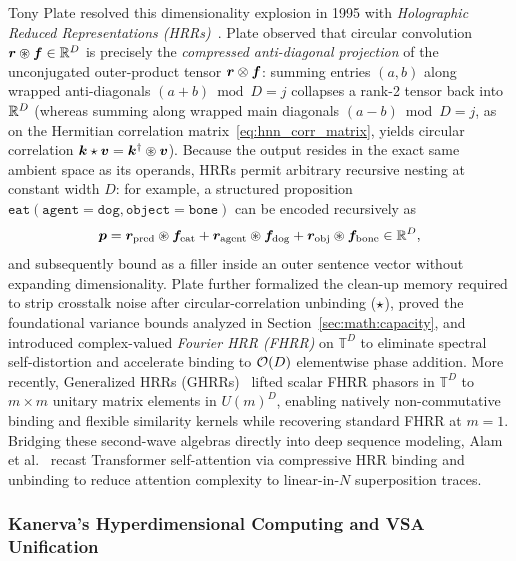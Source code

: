 Tony Plate resolved this dimensionality explosion in 1995 with \emph{Holographic Reduced Representations (HRRs)}~\cite{PLATE_1995_HRR}.
Plate observed that circular convolution $\boldsymbol{r} \circledast \boldsymbol{f} \in \mathbb{R}^D$ is precisely the \emph{compressed anti-diagonal projection} of the unconjugated outer-product tensor $\boldsymbol{r} \otimes \boldsymbol{f}$: summing entries $(a,b)$ along wrapped anti-diagonals $(a + b) \bmod D = j$ collapses a rank-2 tensor back into $\mathbb{R}^D$ (whereas summing along wrapped main diagonals $(a - b) \bmod D = j$, as on the Hermitian correlation matrix~\eqref{eq:hnn_corr_matrix}, yields circular correlation $\boldsymbol{k} \star \boldsymbol{v} = {\boldsymbol{k}}^{\dagger} \circledast \boldsymbol{v}$).
Because the output resides in the exact same ambient space as its operands, HRRs permit arbitrary recursive nesting at constant width $D$: for example, a structured proposition $\texttt{eat}(\texttt{agent}{=}\texttt{dog}, \texttt{object}{=}\texttt{bone})$ can be encoded recursively as
\begin{equation}\label{eq:hrr_recursive}
    \boldsymbol{p} = \boldsymbol{r}_{\mathrm{pred}} \circledast \boldsymbol{f}_{\mathrm{eat}}
             + \boldsymbol{r}_{\mathrm{agent}} \circledast \boldsymbol{f}_{\mathrm{dog}}
             + \boldsymbol{r}_{\mathrm{obj}} \circledast \boldsymbol{f}_{\mathrm{bone}} \in \mathbb{R}^D,
\end{equation}
and subsequently bound as a filler inside an outer sentence vector without expanding dimensionality.
Plate further formalized the clean-up memory required to strip crosstalk noise after circular-correlation unbinding ($\star$), proved the foundational variance bounds analyzed in Section~\ref{sec:math:capacity}, and introduced complex-valued \emph{Fourier HRR (FHRR)} on $\mathbb{T}^D$ to eliminate spectral self-distortion and accelerate binding to $\mathcal{O}\!\left(D\right)$ elementwise phase addition.
More recently, Generalized HRRs (GHRRs)~\cite{YEUNG_2024_GHRR} lifted scalar FHRR phasors in $\mathbb{T}^D$ to $m \times m$ unitary matrix elements in $U(m)^D$, enabling natively non-commutative binding and flexible similarity kernels while recovering standard FHRR at $m=1$.
Bridging these second-wave algebras directly into deep sequence modeling, Alam et al.~\cite{HOLOGRAPHIC_ATTENTION_OR_KV_CACHE} recast Transformer self-attention via compressive HRR binding and unbinding to reduce attention complexity to linear-in-$N$ superposition traces.

\subsubsection{Kanerva's Hyperdimensional Computing and VSA Unification}

